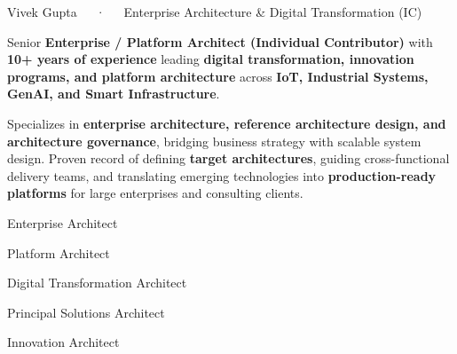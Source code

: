 \documentclass[11pt, a4paper]{awesome-cv}
\begin{document}
\makecvheader[C]

\makecvfooter
  {}
  {Vivek Gupta~~~·~~~Enterprise Architecture \& Digital Transformation (IC)}
  {\thepage}

\vspace{-1.0em}

\begin{cvparagraph}
Senior \textbf{Enterprise / Platform Architect (Individual Contributor)} with \textbf{10+ years of experience}
leading \textbf{digital transformation, innovation programs, and platform architecture}
across \textbf{IoT, Industrial Systems, GenAI, and Smart Infrastructure}.

Specializes in \textbf{enterprise architecture, reference architecture design, and architecture governance},
bridging business strategy with scalable system design.
Proven record of defining \textbf{target architectures}, guiding cross-functional delivery teams,
and translating emerging technologies into \textbf{production-ready platforms}
for large enterprises and consulting clients.
\end{cvparagraph}

\vspace{-0.8em}


\vspace{-0.5em}
\begin{cvitems}
  \item {Enterprise Architect}
  \item {Platform Architect}
  \item {Digital Transformation Architect}
  \item {Principal Solutions Architect}
  \item {Innovation Architect}
\end{cvitems}

\vspace{-0.8em}

\vspace{-0.5em}
\end{document}
